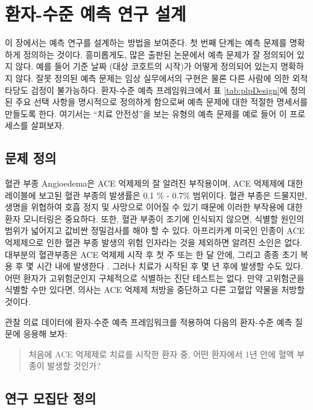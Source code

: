 \documentclass[10.5pt]{book}
\theoremstyle{definition}
\theoremstyle{definition}
\theoremstyle{definition}
\theoremstyle{remark}
\begin{document}
\section{환자-수준 예측 연구 설계}\label{----}

이 장에서는 예측 연구를 설계하는 방법을 보여준다. 첫 번째 단계는 예측
문제를 명확하게 정의하는 것이다. 흥미롭게도, 많은 출판된 논문에서 예측
문제가 잘 정의되어 있지 않다. 예를 들어 기준 날짜 (대상 코호트의 시작)가
어떻게 정의되어 있는지 명확하지 않다. 잘못 정의된 예측 문제는 임상
실무에서의 구현은 물론 다른 사람에 의한 외적 타당도 검정이 불가능하다.
환자-수준 예측 프레임워크에서 표 \ref{tab:plpDesign}에 정의된 주요 선택
사항을 명시적으로 정의하게 함으로써 예측 문제에 대한 적절한 명세서를
만들도록 한다. 여기서는 ``치료 안전성''을 보는 유형의 예측 문제를 예로
들어 이 프로세스를 살펴보자. 

\subsection{문제 정의}\label{--3}

혈관 부종 Angioedema은 ACE 억제제의 잘 알려진 부작용이며, ACE 억제제에
대한 레이블에 보고된 혈관 부종의 발생률은 0.1 \% - 0.7\% 범위이다.
\citep{byrd_2006} 혈관 부종은 드물지만, 생명을 위협하여 호흡 정지 및
사망으로 이어질 수 있기 때문에 이러한 부작용에 대한 환자 모니터링은
중요하다. \citep{norman_2013} 또한, 혈관 부종이 조기에 인식되지 않으면,
식별할 원인의 범위가 넓어지고 값비싼 정밀검사를 해야 할 수 있다.
\citep{norman_2013, thompson_1993} 아프리카계 미국인 인종이 ACE
억제제으로 인한 혈관 부종 발생의 위험 인자라는 것을 제외하면 알려진
소인은 없다. \citep{byrd_2006} 대부분의 혈관부종은 ACE 억제제 시작 후 첫
주 또는 한 달 안에, 그리고 종종 초기 복용 후 몇 시간 내에 발생한다
\citep{circardi_2004}. 그러나 치료가 시작된 후 몇 년 후에 발생할 수도
있다. \citep{mara_1996} 어떤 환자가 고위험군인지 구체적으로 식별하는
진단 테스트는 없다. 만약 고위험군을 식별할 수만 있다면, 의사는 ACE
억제제 처방을 중단하고 다른 고혈압 약물을 처방할
것이다. 

관찰 의료 데이터에 환자-수준 예측 프레임워크를 적용하여 다음의 환자-수준
예측 질문에 응용해 보자:

\begin{quote}
처음에 ACE 억제제로 치료를 시작한 환자 중, 어떤 환자에서 1년 안에 혈액
부종이 발생할 것인가?
\end{quote}

\subsection{연구 모집단 정의}\label{--}
\end{document}

